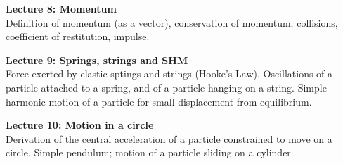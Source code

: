 \documentclass{article}
\begin{document}
{    \vspace{10pt}
    \noindent\textbf{Lecture 8: Momentum}\\
    Definition of momentum (as a vector), conservation of momentum, collisions, coefficient of restitution, impulse.

    \vspace{10pt}
    \noindent\textbf{Lecture 9: Springs, strings and SHM}\\
    Force exerted by elastic sptings and strings (Hooke's Law). Oscillations of a particle attached to a spring, and of a particle hanging on a string. Simple harmonic motion of a particle for small displacement from equilibrium.

    \vspace{10pt}
    \noindent\textbf{Lecture 10: Motion in a circle}\\
    Derivation of the central acceleration of a particle constrained to move on a circle. Simple pendulum; motion of a particle sliding on a cylinder.}
\tableofcontents
\end{document}
